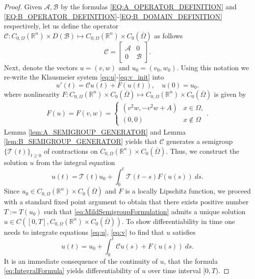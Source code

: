 \documentclass[11pt, a4paper]{article}
\theoremstyle{break}
\theoremstyle{break}
\theoremstyle{break}
\theoremstyle{break}
\theoremstyle{break}
\theoremstyle{break}
\theoremstyle{break}
\begin{document}
\begin{proof}
    Given $\mathcal{A}, \mathcal{B}$ by the formulas \eqref{EQ:A_OPERATOR_DEFINITION} and \eqref{EQ:B_OPERATOR_DEFINITION}-\eqref{EQ:B_DOMAIN_DEFINITION} respectively, let us define the operator $\mathcal{C}: C_{0, \Omega}(\mathbb{R}^n) \times D(\mathcal{B}) \mapsto C_{0, \Omega}(\mathbb{R}^n) \times C_0(\overline{\Omega})$ as follows
    \begin{equation}
        \mathcal{C} = 
        \begin{bmatrix}
            \mathcal{A} & 0\\ 0 & \mathcal{B}
        \end{bmatrix}.
    \end{equation}
    Next, denote the vectors $u = (v, w)$ and $u_0 = (v_0, w_0)$. Using this notation we re-write the Klausmeier system \eqref{eq:u}-\eqref{eq:v_init} into
    \begin{equation}
        \label{eq:ClassicalSemigroupFormulation}
         u'(t) = \mathcal{C} u(t) + F(u(t)), \quad u(0) = u_0.
    \end{equation}
    where nonlinearity $F: C_{0, \Omega}(\mathbb{R}^n) \times C_0(\overline{\Omega}) \mapsto C_{0, \Omega}(\mathbb{R}^n) \times C_0(\overline{\Omega})$ is given by
    \begin{align}
        F(u) = F(v, w) = 
        \begin{cases}
            (v^2 w, -v^2 w + A) &x \in \Omega, \\
            (0, 0) &x \notin \Omega
        \end{cases}.
    \end{align}
    Lemma \ref{lem:A_SEMIGROUP_GENERATOR} and Lemma \ref{lem:B_SEMIGROUP_GENERATOR} yields that $\mathcal{C}$ generates a semigroup $\{\mathcal{T}(t)\}_{t \geq 0}$ of contractions on $C_{0, \Omega}(\mathbb{R}^n) \times C_0(\overline{\Omega})$. Thus, we construct the solution $u$ from the integral equation
    \begin{equation}
        \label{eq:MildSemigroupFormulation}
         u(t) = \mathcal{T}(t) u_0 + \int_0^t \mathcal{T}(t-s) F(u(s)) \:ds.
    \end{equation}
    Since $u_0 \in C_{0, \Omega}(\mathbb{R}^n) \times C_0(\overline{\Omega})$ and $F$ is a locally Lipschitz function, we proceed with a standard fixed point argument to obtain that there exists positive number $T := T(u_0)$ such that \eqref{eq:MildSemigroupFormulation} admits a unique solution $u \in C\left([0, T], C_{0, \Omega}(\mathbb{R}^n) \times C_0(\overline{\Omega})\right)$. To show differentiability in time one needs to integrate equations \eqref{eq:u}, \eqref{eq:v} to find that $u$ satisfies
    \begin{equation}
        \label{eq:IntegralFormula}
        u(t) = u_0 + \int_0^t \mathcal{C}u(s) + F(u(s)) \:ds.
    \end{equation}
    It is an immediate consequence of the continuity of $u$, that the formula \eqref{eq:IntegralFormula} yields differentiability of $u$ over time interval $[0, T)$.
\end{proof}
\end{document}
